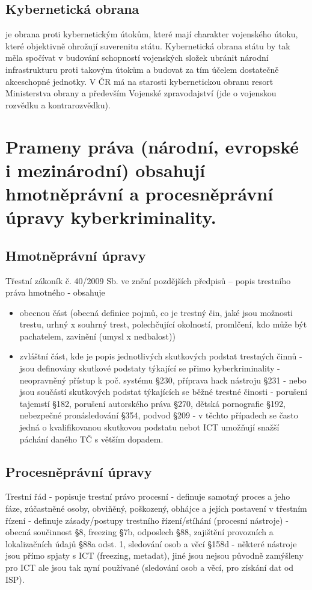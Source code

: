 \subsection{Kybernetická obrana}
je obrana proti kybernetickým útokům, které mají charakter vojenského útoku, které objektivně ohrožují suverenitu státu. Kybernetická obrana státu by tak měla spočívat v budování schopností vojenských složek ubránit národní infrastrukturu proti takovým útokům a budovat za tím účelem dostatečně akceschopné jednotky. V ČR má na starosti kybernetickou obranu resort Ministerstva obrany a především Vojenské zpravodajství (jde o vojenskou rozvědku a kontrarozvědku).

\newpage
\section{Prameny práva (národní, evropské i mezinárodní) obsahují hmotněprávní a procesněprávní úpravy kyberkriminality.}

\subsection{Hmotněprávní úpravy}
Třestní zákoník č. 40/2009 Sb. ve znění pozdějších předpisů -- popis trestního práva hmotného - obsahuje
\begin{itemize}
    \item obecnou část (obecná definice pojmů, co je trestný
čin, jaké jsou možnosti trestu, urhný x souhrný trest, polechčující okolností, promlčení, kdo může
být pachatelem, zavinění (umysl x nedbalost))
    \item zvláštní část, kde je popis jednotlivých
skutkových podstat trestných činnů - jsou definovány skutkové podstaty týkající se přimo
kyberkriminality - neopravněný přístup k poč. systému §230, příprava hack nástroju §231 - nebo
jsou součástí skutkových podstat týkajících se běžné trestné činosti - porušení tajemstí §182,
porušení autorského práva §270, dětská pornografie §192, nebezpečné pronásledování §354,
podvod §209 - v těchto případech se často jedná o kvalifikovanou skutkovou podstatu nebot ICT
umožňují snažší páchání daného TČ s větším dopadem.
\end{itemize} 


\subsection{Procesněprávní úpravy}
Trestní řád - popisuje trestní právo procesní - definuje samotný proces a jeho fáze, zúčastněné
osoby, obviňěný, poškozený, obhájce a jejích postavení v třestním řízení - definuje zásady/postupy
trestního řízení/stíhání (procesní nástroje) - obecná součinnost §8, freezing §7b, odposlech §88,
zajištění provozních a lokalizačních údajů §88a odst. 1, sledování osob a věcí §158d - některé
nástroje jsou přímo spjaty s ICT (freezing, metadat), jiné jsou nejsou původně zamýšleny pro ICT
ale jsou tak nyní používané (sledování osob a věcí, pro získání dat od ISP).

